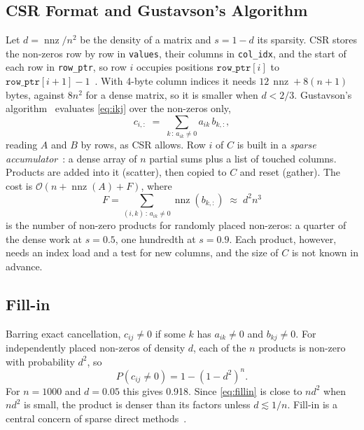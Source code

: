 \documentclass[conference,a4paper]{IEEEtran}
\newcommand{\bigO}[1]{\mathcal{O}\!\left(#1\right)}
\newcommand{\code}[1]{\texttt{#1}}
\newcommand{\nnz}{\operatorname{nnz}}
\begin{document}
\subsection{CSR Format and Gustavson's Algorithm}
Let $d = \nnz/n^2$ be the density of a matrix and $s = 1 - d$ its sparsity.
CSR stores the non-zeros row by row in \code{values}, their columns in
\code{col\_idx}, and the start of each row in \code{row\_ptr}, so row $i$
occupies positions $\code{row\_ptr}[i]$ to
$\code{row\_ptr}[i{+}1]-1$~\cite{saad2003,davis2006}. With 4-byte column
indices it needs $12\,\nnz + 8(n+1)$ bytes, against $8n^2$ for a dense matrix,
so it is smaller when $d < 2/3$. Gustavson's algorithm~\cite{gustavson1978}
evaluates \eqref{eq:ikj} over the non-zeros only,
\begin{equation}
  c_{i,:} \;=\; \sum_{k \,:\, a_{ik} \neq 0} a_{ik}\, b_{k,:},
  \label{eq:gustavson}
\end{equation}
reading $A$ and $B$ by rows, as CSR allows. Row $i$ of $C$ is built in a
\emph{sparse accumulator}~\cite{gilbert1992}: a dense array of $n$ partial sums
plus a list of touched columns. Products are added into it (scatter), then
copied to $C$ and reset (gather). The cost is $\bigO{n + \nnz(A) + F}$, where
\begin{equation}
  F = \sum_{(i,k)\,:\,a_{ik} \neq 0} \nnz(b_{k,:}) \;\approx\; d^2 n^3
  \label{eq:flops}
\end{equation}
is the number of non-zero products for randomly placed non-zeros: a quarter of
the dense work at $s = 0.5$, one hundredth at $s = 0.9$. Each product, however,
needs an index load and a test for new columns, and the size of $C$ is not
known in advance.

\subsection{Fill-in}
\label{sec:bg-fillin}
Barring exact cancellation, $c_{ij} \neq 0$ if some $k$ has $a_{ik} \neq 0$ and
$b_{kj} \neq 0$. For independently placed non-zeros of density $d$, each of the
$n$ products is non-zero with probability $d^2$, so
\begin{equation}
  P(c_{ij} \neq 0) = 1 - (1 - d^2)^n .
  \label{eq:fillin}
\end{equation}
For $n = 1000$ and $d = 0.05$ this gives 0.918. Since \eqref{eq:fillin} is
close to $n d^2$ when $n d^2$ is small, the product is denser than its factors
unless $d \lesssim 1/n$. Fill-in is a central concern of sparse direct
methods~\cite{davis2006}.
\end{document}
